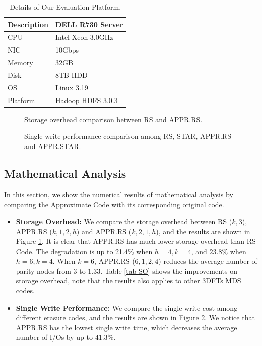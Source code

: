 \documentclass[sigconf]{acmart}
\begin{document}
\begin{table}[ht]\footnotesize
\caption{Details of Our Evaluation Platform.}\label{tab-platform}
\begin{tabular}{|l|l|}
\hline
Description & DELL R730 Server \\ \hline
CPU & Intel Xeon 3.0GHz \\ \hline
NIC & 10Gbps \\ \hline
Memory & 32GB \\ \hline
Disk & 8TB HDD \\ \hline
OS & Linux 3.19 \\ \hline
Platform & Hadoop HDFS 3.0.3 \\ \hline
\end{tabular}
\end{table}


\begin{figure}[ht]
\caption{Storage overhead comparison between RS and APPR.RS.}\label{fig-Storage}
\end{figure}

\begin{figure}[ht]
    
\caption{Single write performance comparison among RS, STAR, APPR.RS and APPR.STAR.}\label{fig-Sig-Write}
\end{figure}

\subsection{Mathematical Analysis}
In this section, we show the numerical results of mathematical analysis by comparing the Approximate Code with its corresponding original code.

\begin{itemize}
    \item \textbf{Storage Overhead:} We compare the storage overhead between RS ($k,3$), APPR.RS ($k,1,2,h$) and APPR.RS ($k,2,1,h$), and the results are shown in Figure \ref{fig-Storage}. It is clear that APPR.RS has much lower storage overhead than RS Code. The degradation is up to 21.4\% when $h=4, k=4$, and $23.8\%$ when $h=6, k=4$. When $k=6$, APPR.RS ($6,1,2,4$) reduces the average number of parity nodes from $3$ to $1.33$.
    Table \ref{tab-SO} shows the improvements on storage overhead, note that the results also applies to other 3DFTs MDS codes.
    \item \textbf{Single Write Performance:} We compare the single write cost among different erasure codes, and the results are shown in Figure \ref{fig-Sig-Write}. We notice that APPR.RS has the lowest single write time, which decreases the average number of I/Os by up to  $41.3\%$.
\end{itemize}
\end{document}
